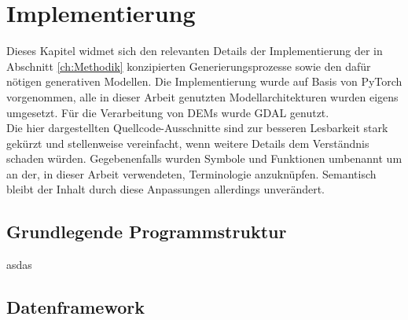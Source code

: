 \chapter{Implementierung}
\label{ch:Implementierung}

Dieses Kapitel widmet sich den relevanten Details der Implementierung der in Abschnitt \ref{ch:Methodik} konzipierten Generierungsprozesse sowie den dafür nötigen generativen Modellen. Die Implementierung wurde auf Basis von PyTorch vorgenommen, alle in dieser Arbeit genutzten Modellarchitekturen wurden eigens umgesetzt. Für die Verarbeitung von DEMs wurde GDAL genutzt.\\
Die hier dargestellten Quellcode-Ausschnitte sind zur besseren Lesbarkeit stark gekürzt und stellenweise vereinfacht, wenn weitere Details dem Verständnis schaden würden. Gegebenenfalls wurden Symbole und Funktionen umbenannt um an der, in dieser Arbeit verwendeten, Terminologie anzuknüpfen. Semantisch bleibt der Inhalt durch diese Anpassungen allerdings unverändert.

\section {Grundlegende Programmstruktur}

asdas


\section {Datenframework}

